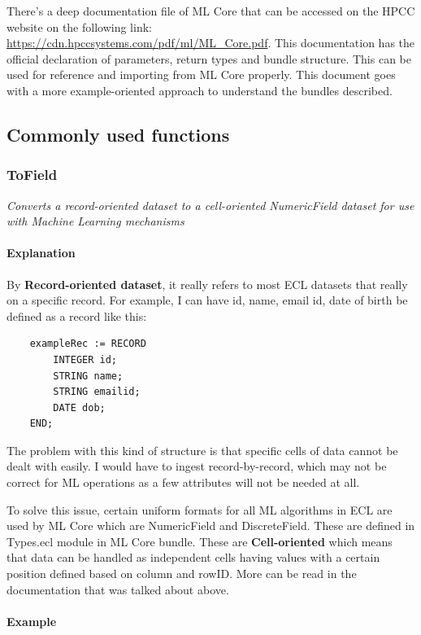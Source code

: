 \documentclass[a4paper,oneside,12pt]{book}
\begin{document}
There's a deep documentation file of ML Core that can be accessed on the HPCC website on the following link: \url{https://cdn.hpccsystems.com/pdf/ml/ML\_Core.pdf}. This documentation has the official declaration of parameters, return types and bundle structure. This can be used for reference and importing from ML Core properly. This document goes with a more example-oriented approach to understand the bundles described.

\subsection{Commonly used functions}

\subsubsection{ToField}\label{mlcore:tofield}

\textit{Converts a record-oriented dataset to a cell-oriented NumericField dataset for use with Machine Learning mechanisms}

\paragraph{Explanation}

By \textbf{Record-oriented dataset}, it really refers to most ECL datasets that really on a specific record. For example, I can have id, name, email id, date of birth be defined as a record like this:

\begin{lstlisting}
    exampleRec := RECORD
        INTEGER id;
        STRING name;
        STRING emailid;
        DATE dob;
    END;
\end{lstlisting}

The problem with this kind of structure is that specific cells of data cannot be dealt with easily. I would have to ingest record-by-record, which may not be correct for ML operations as a few attributes will not be needed at all.

To solve this issue, certain uniform formats for all ML algorithms in ECL are used by ML Core which are NumericField and DiscreteField. These are defined in Types.ecl module in ML Core bundle. These are \textbf{Cell-oriented} which means that data can be handled as independent cells having values with a certain position defined based on column and rowID. More can be read in the documentation that was talked about above.

\paragraph{Example}
\end{document}
